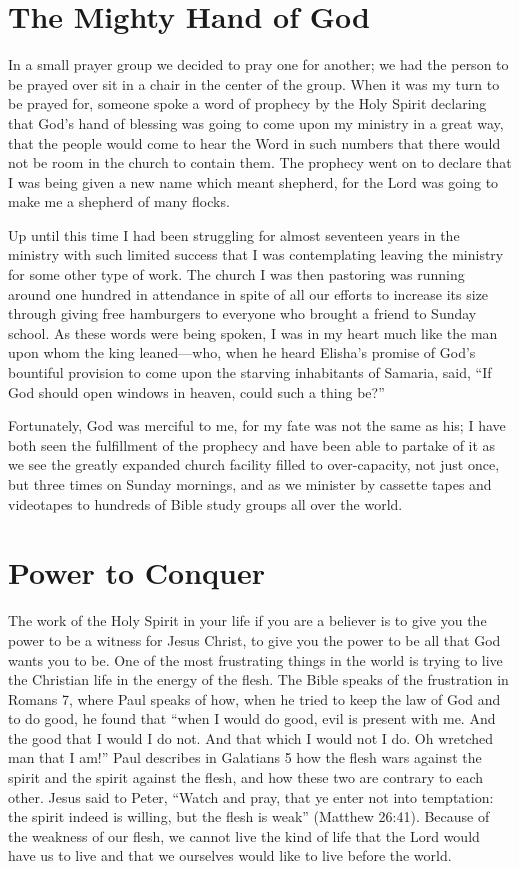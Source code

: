 \section*{The Mighty Hand of God}

In a small prayer group we decided to pray one for
another; we had the person to be prayed over sit in a chair
in the center of the group. When it was my turn to be prayed
for, someone spoke a word of prophecy by the Holy Spirit
declaring that God’s hand of blessing was going to come
upon my ministry in a great way, that the people would
come to hear the Word in such numbers that there would
not be room in the church to contain them. The prophecy
went on to declare that I was being given a new name which
meant shepherd, for the Lord was going to make me a shepherd
of many flocks.

Up until this time I had been struggling for almost seventeen
years in the ministry with such limited success that
I was contemplating leaving the ministry for some other
type of work. The church I was then pastoring was running
around one hundred in attendance in spite of all our efforts
to increase its size through giving free hamburgers to everyone
who brought a friend to Sunday school. As these words
were being spoken, I was in my heart much like the man
upon whom the king leaned—who, when he heard Elisha’s
promise of God’s bountiful provision to come upon the
starving inhabitants of Samaria, said, “If God should open
windows in heaven, could such a thing be?”

Fortunately, God was merciful to me, for my fate was
not the same as his; I have both seen the fulfillment of the
prophecy and have been able to partake of it as we see the
greatly expanded church facility filled to over-capacity, not
just once, but three times on Sunday mornings, and as we
minister by cassette tapes and videotapes to hundreds of
Bible study groups all over the world.


\section*{Power to Conquer}

The work of the Holy Spirit in your life if you are a
believer is to give you the power to be a witness for Jesus
Christ, to give you the power to be all that God wants you to
be. One of the most frustrating things in the world is trying
to live the Christian life in the energy of the flesh. The Bible
speaks of the frustration in Romans 7, where Paul speaks of
how, when he tried to keep the law of God and to do good,
he found that “when I would do good, evil is present with
me. And the good that I would I do not. And that which I
would not I do. Oh wretched man that I am!” Paul describes
in Galatians 5 how the flesh wars against the spirit and the
spirit against the flesh, and how these two are contrary to
each other. Jesus said to Peter, “Watch and pray, that ye
enter not into temptation: the spirit indeed is willing, but
the flesh is weak” (Matthew 26:41). Because of the weakness
of our flesh, we cannot live the kind of life that the Lord
would have us to live and that we ourselves would like to
live before the world.

